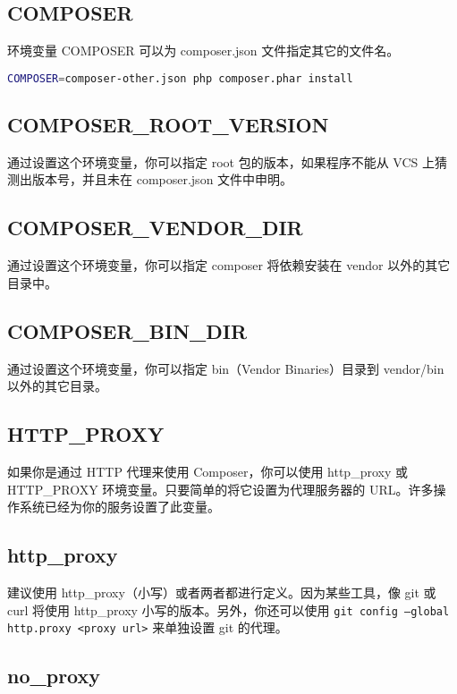 \subsection{COMPOSER}

环境变量 COMPOSER 可以为 composer.json 文件指定其它的文件名。

\begin{lstlisting}[language=bash]
COMPOSER=composer-other.json php composer.phar install
\end{lstlisting}

\subsection{COMPOSER\_ROOT\_VERSION}

通过设置这个环境变量，你可以指定 root 包的版本，如果程序不能从 VCS 上猜测出版本号，并且未在 composer.json 文件中申明。

\subsection{COMPOSER\_VENDOR\_DIR}

通过设置这个环境变量，你可以指定 composer 将依赖安装在 vendor 以外的其它目录中。


\subsection{COMPOSER\_BIN\_DIR}

通过设置这个环境变量，你可以指定 bin（Vendor Binaries）目录到 vendor/bin 以外的其它目录。


\subsection{HTTP\_PROXY}

如果你是通过 HTTP 代理来使用 Composer，你可以使用 http\_proxy 或 HTTP\_PROXY 环境变量。只要简单的将它设置为代理服务器的 URL。许多操作系统已经为你的服务设置了此变量。

\subsection{http\_proxy}


建议使用 http\_proxy（小写）或者两者都进行定义。因为某些工具，像 git 或 curl 将使用 http\_proxy 小写的版本。另外，你还可以使用 \texttt{git config --global http.proxy <proxy url>} 来单独设置 git 的代理。


\subsection{no\_proxy}

